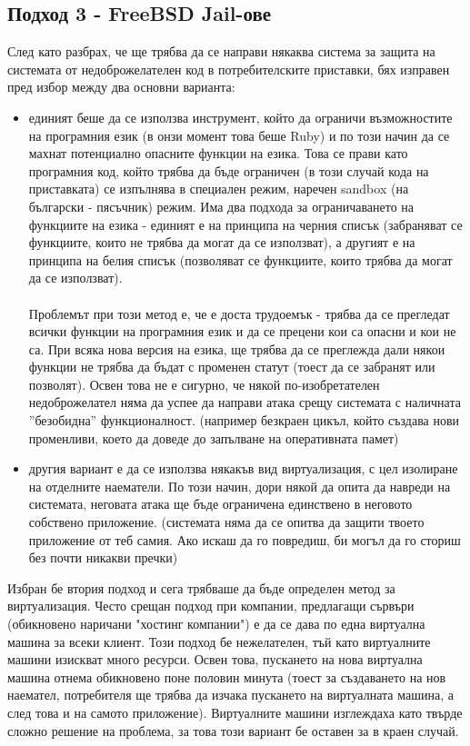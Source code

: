 \documentclass[pdftex,14pt,a4paper]{extreport}
\begin{document}
\subsection {Подход 3 - FreeBSD Jail-ове}
След като разбрах, че ще трябва да се направи някаква система за защита на системата от недоброжелателен код в потребителските приставки, бях изправен пред избор между два основни варианта:
\begin{itemize}
  \item единият беше да се използва инструмент, който да ограничи възможностите на програмния език (в онзи момент това беше Ruby) и по този начин да се махнат потенциално опасните функции на езика. Това се прави като програмния код, който трябва да бъде ограничен (в този случай кода на приставката) се изпълнява в специален режим, наречен sandbox (на български - пясъчник) режим. Има два подхода за ограничаването на функциите на езика - единият е на принципа на черния списък (забраняват се функциите, които не трябва да могат да се използват), а другият е на принципа на белия списък (позволяват се функциите, които трябва да могат да се използват).
\paragraph {}

    Проблемът при този метод е, че е доста трудоемък - трябва да се прегледат всички функции на програмния език и да се прецени кои са опасни и кои не са. При всяка нова версия на езика, ще трябва да се преглежда дали някои функции не трябва да бъдат с променен статут (тоест да се забранят или позволят). Освен това не е сигурно, че някой по-изобретателен недоброжелател няма да успее да направи атака срещу системата с наличната ''безобидна'' функционалност. (например безкраен цикъл, който създава нови променливи, което да доведе до запълване на оперативната памет)
  \item другия вариант е да се използва някакъв вид виртуализация, с цел изолиране на отделните наематели. По този начин, дори някой да опита да навреди на системата, неговата атака ще бъде ограничена единствено в неговото собствено приложение. (системата няма да се опитва да защити твоето приложение от теб самия. Ако искаш да го повредиш, би могъл да го сториш без почти никакви пречки)
\end{itemize}
Избран бе втория подход и сега трябваше да бъде определен метод за виртуализация. Често срещан подход при компании, предлагащи сървъри (обикновено наричани "хостинг компании") е да се дава по една виртуална машина за всеки клиент. Този подход бе нежелателен, тъй като виртуалните машини изискват много ресурси. Освен това, пускането на нова виртуална машина отнема обикновено поне половин минута (тоест за създаването на нов наемател, потребителя ще трябва да изчака пускането на виртуалната машина, а след това и на самото приложение). Виртуалните машини изглеждаха като твърде сложно решение на проблема, за това този вариант бе оставен за в краен случай.
\end{document}
